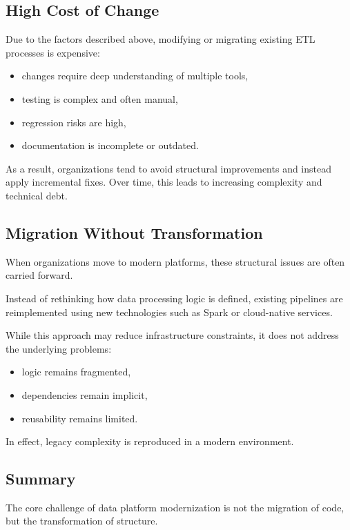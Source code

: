 \documentclass[11pt,a4paper]{article}
\begin{document}
\subsection{High Cost of Change}

Due to the factors described above, modifying or migrating existing ETL processes is expensive:
\begin{itemize}
  \item changes require deep understanding of multiple tools,
  \item testing is complex and often manual,
  \item regression risks are high,
  \item documentation is incomplete or outdated.
\end{itemize}

As a result, organizations tend to avoid structural improvements and instead apply incremental fixes. Over time, this leads to increasing complexity and technical debt.

\subsection{Migration Without Transformation}

When organizations move to modern platforms, these structural issues are often carried forward.

Instead of rethinking how data processing logic is defined, existing pipelines are reimplemented using new technologies such as Spark or cloud-native services.

While this approach may reduce infrastructure constraints, it does not address the underlying problems:
\begin{itemize}
  \item logic remains fragmented,
  \item dependencies remain implicit,
  \item reusability remains limited.
\end{itemize}

In effect, legacy complexity is reproduced in a modern environment.

\subsection{Summary}

The core challenge of data platform modernization is not the migration of code, but the transformation of structure.
\end{document}
